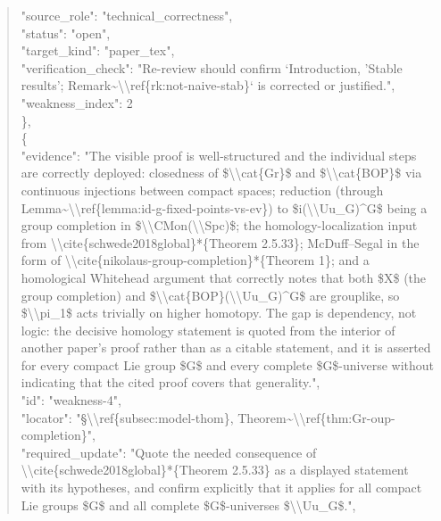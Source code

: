 \documentclass[11pt]{article}
\begin{document}
\begin{quote}
      "source\_role": "technical\_correctness",\\
      "status": "open",\\
      "target\_kind": "paper\_tex",\\
      "verification\_check": "Re-review should confirm `Introduction, 'Stable results'; Remark\~{}\textbackslash{}\textbackslash{}ref\{rk:not-naive-stab\}` is corrected or justified.",\\
      "weakness\_index": 2\\
    \},\\
    \{\\
      "evidence": "The visible proof is well-structured and the individual steps are correctly deployed: closedness of \$\textbackslash{}\textbackslash{}cat\{Gr\}\$ and \$\textbackslash{}\textbackslash{}cat\{BOP\}\$ via continuous injections between compact spaces; reduction (through Lemma\~{}\textbackslash{}\textbackslash{}ref\{lemma:id-g-fixed-points-vs-ev\}) to \$i(\textbackslash{}\textbackslash{}Uu\_G)\^{}G\$ being a group completion in \$\textbackslash{}\textbackslash{}CMon(\textbackslash{}\textbackslash{}Spc)\$; the homology-localization input from \textbackslash{}\textbackslash{}cite\{schwede2018global\}*\{Theorem 2.5.33\}; McDuff--Segal in the form of \textbackslash{}\textbackslash{}cite\{nikolaus-group-completion\}*\{Theorem 1\}; and a homological Whitehead argument that correctly notes that both \$X\$ (the group completion) and \$\textbackslash{}\textbackslash{}cat\{BOP\}(\textbackslash{}\textbackslash{}Uu\_G)\^{}G\$ are grouplike, so \$\textbackslash{}\textbackslash{}pi\_1\$ acts trivially on higher homotopy. The gap is dependency, not logic: the decisive homology statement is quoted from the interior of another paper's proof rather than as a citable statement, and it is asserted for every compact Lie group \$G\$ and every complete \$G\$-universe without indicating that the cited proof covers that generality.",\\
      "id": "weakness-4",\\
      "locator": "§\textbackslash{}\textbackslash{}ref\{subsec:model-thom\}, Theorem\~{}\textbackslash{}\textbackslash{}ref\{thm:Gr-oup-completion\}",\\
      "required\_update": "Quote the needed consequence of \textbackslash{}\textbackslash{}cite\{schwede2018global\}*\{Theorem 2.5.33\} as a displayed statement with its hypotheses, and confirm explicitly that it applies for all compact Lie groups \$G\$ and all complete \$G\$-universes \$\textbackslash{}\textbackslash{}Uu\_G\$.",\\

\end{quote}
\end{document}
